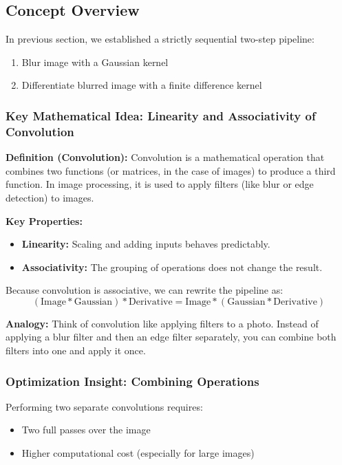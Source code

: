 \documentclass[12pt]{article}
\begin{document}
\subsection{Concept Overview}

In previous section, we established a strictly sequential two-step pipeline:
\begin{enumerate}
    \item Blur image with a Gaussian kernel
    \item Differentiate blurred image with a finite difference kernel
\end{enumerate}

\subsubsection{Key Mathematical Idea: Linearity and Associativity of Convolution}

\textbf{Definition (Convolution):}
Convolution is a mathematical operation that combines two functions (or matrices, in the case of images) to produce a third function. In image processing, it is used to apply filters (like blur or edge detection) to images.

\textbf{Key Properties:}
\begin{itemize}
    \item \textbf{Linearity:} Scaling and adding inputs behaves predictably.
    \item \textbf{Associativity:} The grouping of operations does not change the result.
\end{itemize}

Because convolution is associative, we can rewrite the pipeline as:
\[
    (\text{Image} * \text{Gaussian}) * \text{Derivative}
    = \text{Image} * (\text{Gaussian} * \text{Derivative})
\]

\textbf{Analogy:}
Think of convolution like applying filters to a photo. Instead of applying a blur filter and then an edge filter separately, you can combine both filters into one and apply it once.

\subsubsection{Optimization Insight: Combining Operations}

Performing two separate convolutions requires:
\begin{itemize}
    \item Two full passes over the image
    \item Higher computational cost (especially for large images)
\end{itemize}
\end{document}

